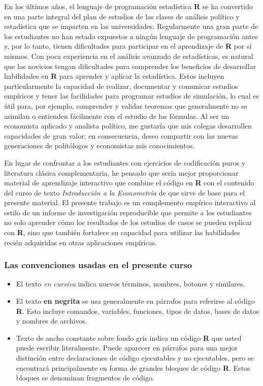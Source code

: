 \documentclass[
]{book}
\begin{document}
En los últimos años, el lenguaje de programación estadística \textbf{R} se ha convertido en una parte integral del plan de estudios de las clases de análisis político y estadística que se imparten en las universidades. Regularmente una gran parte de los estudiantes no han estado expuestos a ningún lenguaje de programación antes y, por lo tanto, tienen dificultades para participar en el aprendizaje de \textbf{R} por sí mismos. Con poca experiencia en el análisis avanzado de estadísticas, es natural que los novicios tengan dificultades para comprender los beneficios de desarrollar habilidades en \textbf{R} para aprender y aplicar la estadística. Estos incluyen particularmente la capacidad de realizar, documentar y comunicar estudios empíricos y tener las facilidades para programar estudios de simulación, lo cual es útil para, por ejemplo, comprender y validar teoremas que generalmente no se asimilan o entienden fácilmente con el estudio de las fórmulas. Al ser un economista aplicado y analista político, me gustaría que mis colegas desarrollen capacidades de gran valor; en consecuencia, deseo compartir con las nuevas generaciones de politólogos y economistas mis conocimientos.

En lugar de confrontar a los estudiantes con ejercicios de codificación puros y literatura clásica complementaria, he pensado que sería mejor proporcionar material de aprendizaje interactivo que combine el código en \textbf{R} con el contenido del curso de texto \emph{Introducción a la Econometría} de \citet{stock2015} que sirve de base para el presente material. El presente trabajo es un complemento empírico interactivo al estilo de un informe de investigación reproducible que permite a los estudiantes no solo aprender cómo los resultados de los estudios de casos se pueden replicar con \textbf{R}, sino que también fortalece su capacidad para utilizar las habilidades recién adquiridas en otras aplicaciones empíricas.

\hypertarget{las-convenciones-usadas-en-el-presente-curso}{%
\subsubsection*{Las convenciones usadas en el presente curso}\label{las-convenciones-usadas-en-el-presente-curso}}

\begin{itemize}
\item
  El texto \emph{en cursiva} indica nuevos términos, nombres, botones y similares.
\item
  El texto \textbf{en negrita} se usa generalmente en párrafos para referirse al código \textbf{R}. Esto incluye comandos, variables, funciones, tipos de datos, bases de datos y nombres de archivos.
\item
  Texto de ancho constante sobre fondo gris indica un código \textbf{R} que usted puede escribir literalmente. Puede aparecer en párrafos para una mejor distinción entre declaraciones de código ejecutables y no ejecutables, pero se encontrará principalmente en forma de grandes bloques de código \textbf{R}. Estos bloques se denominan fragmentos de código.
\end{itemize}
\end{document}
